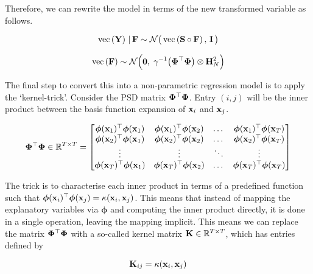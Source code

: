 Therefore, we can rewrite the model in terms of the new transformed variable as follows. 

\begin{equation}
    \text{\textup{vec}}\left(\mathbf{Y}\right) \, | \, \mathbf{F} \sim \mathcal{N}\big(\, \text{\textup{vec}}\left(\mathbf{S} \circ \mathbf{F}\right), \, \mathbf{I} \, \big)
\end{equation}

\begin{equation}
    \label{eq:F_prior2}
    \text{\textup{vec}}\left(\mathbf{F}\right) \sim \mathcal{N}\Big(\mathbf{0}, \; \gamma^{-1} \big(\mathbf{\Phi}^\top \mathbf{\Phi} \big) \otimes \mathbf{H}_N^{2}\Big)
\end{equation}


The final step to convert this into a non-parametric regression model is to apply the `kernel-trick'. Consider the PSD matrix $\mathbf{\Phi}^\top \mathbf{\Phi}$. Entry $(i, j)$ will be the inner product between the basis function expansion of $\mathbf{x}_i$ and $\mathbf{x}_j$. 

\begin{equation}
    \mathbf{\Phi}^\top \mathbf{\Phi} \in \mathbb{R}^{T \times T} = 
    \begin{bmatrix} 
        \boldsymbol{\phi}(\mathbf{x}_1)^\top\boldsymbol{\phi}(\mathbf{x}_1) & \boldsymbol{\phi}(\mathbf{x}_1)^\top\boldsymbol{\phi}(\mathbf{x}_2) & \dots & \boldsymbol{\phi}(\mathbf{x}_1)^\top\boldsymbol{\phi}(\mathbf{x}_T) \\
        \boldsymbol{\phi}(\mathbf{x}_2)^\top\boldsymbol{\phi}(\mathbf{x}_1) & \boldsymbol{\phi}(\mathbf{x}_2)^\top\boldsymbol{\phi}(\mathbf{x}_2) & \dots & \boldsymbol{\phi}(\mathbf{x}_2)^\top\boldsymbol{\phi}(\mathbf{x}_T) \\
        \vdots & \vdots & \ddots & \vdots  \\
        \boldsymbol{\phi}(\mathbf{x}_T)^\top\boldsymbol{\phi}(\mathbf{x}_1) & \boldsymbol{\phi}(\mathbf{x}_T)^\top\boldsymbol{\phi}(\mathbf{x}_2) & \dots & \boldsymbol{\phi}(\mathbf{x}_T)^\top\boldsymbol{\phi}(\mathbf{x}_T) \\
    \end{bmatrix}
\end{equation}

The trick is to characterise each inner product in terms of a predefined function such that $\boldsymbol{\phi}(\mathbf{x}_i)^\top\boldsymbol{\phi}(\mathbf{x}_j) = \kappa(\mathbf{x}_i, \mathbf{x}_j)$. This means that instead of mapping the explanatory variables via $\boldsymbol{\phi}$ and computing the inner product directly, it is done in a single operation, leaving the mapping implicit. This means we can replace the matrix $\mathbf{\Phi}^\top \mathbf{\Phi}$ with a so-called kernel matrix $\mathbf{K} \in \mathbb{R}^{T \times T}$, which has entries defined by 

\begin{equation}
    \mathbf{K}_{ij} =  \kappa(\mathbf{x}_i, \mathbf{x}_j)
\end{equation}


